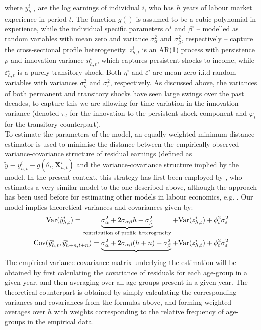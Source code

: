 where $y_{h,t}^i$ are the log earnings of individual $i$, who has $h$ years of
labour market experience in period $t$. The function $g()$ is assumed to be
a cubic polynomial in experience, while the individual specific parameters
$\alpha^i$ and $\beta^i$ -- modelled as random variables with mean zero and
variance $\sigma^2_{\alpha}$ and $\sigma^2_{\beta}$, respectively --
 capture the cross-sectional profile heterogeneity.
$z_{h,t}^i$ is an AR(1) process with persistence $\rho$ and innovation variance
$\eta_{h,t}^i$, which captures persistent shocks to income, while
$\varepsilon_{h,t}^i$ is a purely transitory shock. Both $\eta^i$ and
$\varepsilon^i$ are mean-zero i.i.d random variables with variances
$\sigma^2_{\eta}$ and $\sigma^2_{\varepsilon}$, respectively. As discussed
above, the variances of both permanent and transitory shocks have seen large
swings over the past decades, to capture this we are allowing for time-variation
in the innovation variance (denoted $\pi_t$ for the innovation to the persistent
shock component and $\varphi_t$ for the transitory counterpart). \\
To estimate the parameters of the model, an equally weighted minimum distance
estimator is used to minimise the distance between the empirically observed
variance-covariance structure of residual earnings (defined as $\tilde{y} \equiv
y_{h,t}^i - g(\theta_t, \pmb{X}_{h,t}^i)$ and the variance-covariance
structure implied by the model. In the present context, this strategy has first
been employed by \citet{Baker1997}, who estimates a very similar model to the one
 described above, although the approach has been used before for estimating
other models in labour economics, e.g. \citet{AbowdCard89}. Our model implies
theoretical variances and covariances given by:
\begin{align}
\mbox{Var}(\tilde{y}_{h,t}^i) = \underbrace{\sigma^2_{\alpha} + 2 \sigma_{\alpha \beta} h + \sigma^2_{\beta}}_{\text{contribution of profile heterogeneity}} + \mbox{Var}(z^i_{h,t}) + \phi_t^2 \sigma^2_{\varepsilon} \\
\mbox{Cov}(\tilde{y}_{h,t}^i, \tilde{y}_{h+n,t+n}^i) = \underbrace{\sigma^2_{\alpha} + 2 \sigma_{\alpha \beta} (h+n) + \sigma^2_{\beta}} + \mbox{Var}(z^i_{h,t}) + \phi_t^2 \sigma^2_{\varepsilon}
\end{align}
The empirical variance-covariance matrix underlying the estimation will be
obtained by first calculating the covariance of residuals for each age-group
in a given year, and then averaging over all age groups present in a given year.
The theoretical counterpart is obtained by simply calculating the corresponding
variances and covariances from the formulas above, and forming weighted averages
over $h$ with weights corresponding to the relative frequency of age-groups in
the empirical data.

